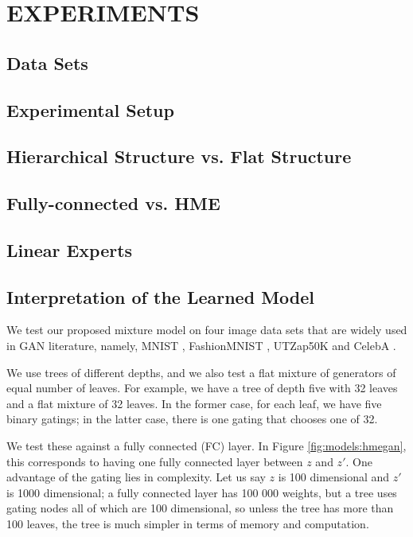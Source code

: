 \documentclass[a4paper,onesided,12pt]{report}
\begin{document}
\chapter{EXPERIMENTS}
\label{chapter:exps}

\section{Data Sets}
\label{sec:datasets}

\section{Experimental Setup}
\label{sec:setup}

\section{Hierarchical Structure vs. Flat Structure}
\label{sec:hme-vs-me}

\section{Fully-connected vs. HME}
\label{sec:fc-vs-hme}

\section{Linear Experts}
\label{sec:hme-linear}

\section{Interpretation of the Learned Model}
\label{sec:interpret}

We test our proposed mixture model on four image data sets that are widely used in GAN literature, namely, MNIST \cite{mnist}, FashionMNIST \cite{fashion}, UTZap50K \cite{utzap50k} and CelebA \cite{celeba}. 

We use trees of different depths, and we also test a flat mixture of generators of equal number of leaves. For example, we have a tree of depth five with 32 leaves and a flat mixture of 32 leaves. In the former case, for each leaf, we have five binary gatings; in the latter case, there is one gating that chooses one of 32. 

We test these against a fully connected (FC) layer. In Figure \ref{fig:models:hmegan}, this corresponds to having one fully connected layer between $z$ and $z'$. One advantage of the gating lies in complexity. Let us say $z$ is 100 dimensional and $z'$ is 1000 dimensional; a fully connected layer has 100 000 weights, but a tree uses gating nodes all of which are 100 dimensional, so unless the tree has more than 100 leaves, the tree is much simpler in terms of memory and computation.
\end{document}
